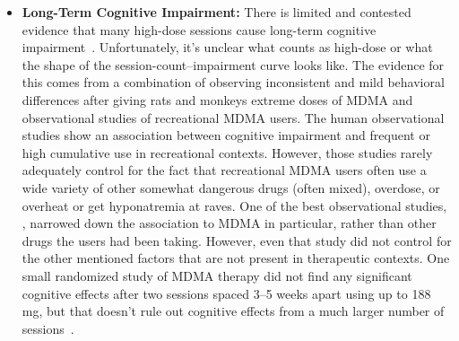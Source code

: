\documentclass[11pt,oneside]{book}
\let\cite\parencite
\begin{document}
\begin{itemize}
    A dose of MDMA that is not neurotoxic in a single administration can also become neurotoxic when additional administrations are done before the antioxidant system has recovered~\cite{baggottDamage}. Unfortunately, it's not known how long this recovery takes. It's also unclear whether this oxidative damage has any clinically relevant effects.
    \item \textbf{Long-Term Cognitive Impairment:} There is limited and contested evidence that many high-dose sessions cause long-term cognitive impairment~\cite{baggottDamage}. Unfortunately, it's unclear what counts as high-dose or what the shape of the session-count--impairment curve looks like. The evidence for this comes from a combination of observing inconsistent and mild behavioral differences after giving rats and monkeys extreme doses of MDMA and observational studies of recreational MDMA users. The human observational studies show an association between cognitive impairment and frequent or high cumulative use in recreational contexts. However, those studies rarely adequately control for the fact that recreational MDMA users often use a wide variety of other somewhat dangerous drugs (often mixed), overdose, or overheat or get hyponatremia at raves. One of the best observational studies, \textcite{corayMemory}, narrowed down the association to MDMA in particular, rather than other drugs the users had been taking. However, even that study did not control for the other mentioned factors that are not present in therapeutic contexts. One small randomized study of MDMA therapy did not find any significant cognitive effects after two sessions spaced 3--5 weeks apart using up to 188\,mg, but that doesn't rule out cognitive effects from a much larger number of sessions~\cite{mithoeferSafety}.
\end{itemize}
\end{document}
